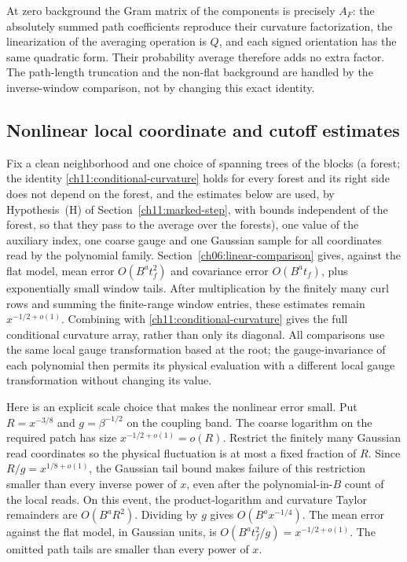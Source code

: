 At zero background the Gram matrix of the components is precisely $A_F$:
the absolutely summed path coefficients reproduce their curvature
factorization, the linearization of the averaging operation is $Q$, and each signed
orientation has the same quadratic form. Their probability average
therefore adds no extra factor. The path-length truncation and the non-flat
background are handled by the inverse-window comparison, not by
changing this exact identity.

\subsection{Nonlinear local coordinate and cutoff estimates}
\label{ch11:actual-reader}

Fix a clean neighborhood and one choice of spanning trees of the blocks (a forest; the identity \eqref{ch11:conditional-curvature} holds for every forest and its right side does not depend on the forest, and the estimates below are used, by Hypothesis~(H) of Section~\ref{ch11:marked-step}, with bounds independent of the forest, so that they pass to the average over the forests), one value of the auxiliary index, one coarse gauge and one Gaussian
sample for all coordinates read by the polynomial family.
Section~\ref{ch06:linear-comparison} gives, against the flat model, mean error
$O(B^a t_f^2)$ and covariance error $O(B^a t_f)$, plus exponentially
small window tails. After multiplication by the finitely many curl
rows and summing the finite-range window entries, these estimates
remain $x^{-1/2+o(1)}$.
Combining with \eqref{ch11:conditional-curvature} gives the full
conditional curvature array, rather than only its diagonal.
All comparisons use the same local gauge transformation based at the root; the gauge-invariance of each
polynomial then permits its physical evaluation with a different local
gauge transformation without changing its value.

Here is an explicit scale choice that makes the nonlinear error small.
Put $R=x^{-3/8}$ and $g=\beta^{-1/2}$ on the coupling band.
The coarse logarithm on the required patch has size
$x^{-1/2+o(1)}=o(R)$.
Restrict the finitely many Gaussian read coordinates so the physical
fluctuation is at most a fixed fraction of $R$.
Since $R/g=x^{1/8+o(1)}$, the Gaussian tail bound makes failure of
this restriction smaller than every inverse power of $x$, even after
the polynomial-in-$B$ count of the local reads.
On this event, the product-logarithm and curvature Taylor remainders
are $O(B^a R^2)$. Dividing by $g$ gives
$O(B^a x^{-1/4})$.
The mean error against the flat model, in Gaussian units, is
$O(B^a t_f^2/g)=x^{-1/2+o(1)}$.
The omitted path tails are smaller than every power of $x$.

